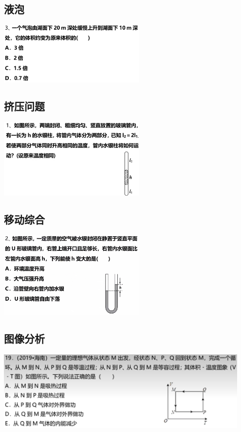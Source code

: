 \documentclass{article}
\begin{document}
\vspace{2em}

\subsection{液泡}
\includegraphics[width=0.55\textwidth,keepaspectratio]{./pictures/2.3-2.png}

\vspace{2em}

\subsection{挤压问题}
\includegraphics[width=0.55\textwidth,keepaspectratio]{./pictures/2.3-5.png}

\vspace{2em}

\subsection{移动综合}
\includegraphics[width=0.55\textwidth,keepaspectratio]{./pictures/2.3-9.png}

\vspace{2em}

\subsection{图像分析}
\includegraphics[width=0.95\textwidth,keepaspectratio]{./pictures/2.3-35.png}
\end{document}
